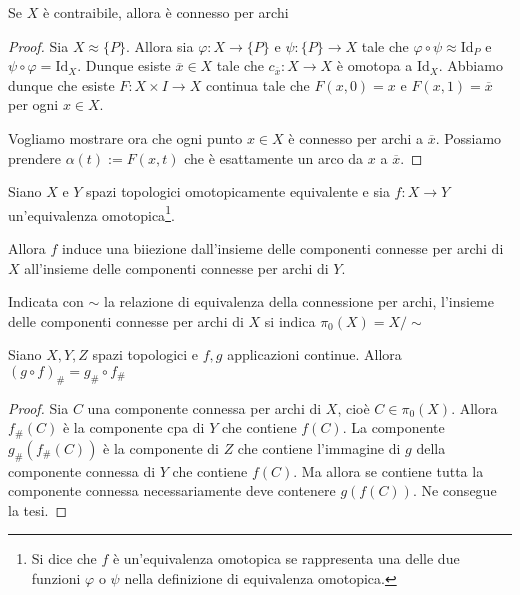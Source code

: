 \begin{proposition}\label{prop:contr_cpa}
    Se \(X\) è contraibile, allora è connesso per archi
\end{proposition}
\begin{proof}
    Sia \(X \approx \{P\} \). Allora sia \(\varphi : X \to \{P\} \) e \(\psi :
    \{P\} \to X\) tale che \(\varphi \circ \psi \approx \mathrm{Id}_P\) e \(\psi
    \circ \varphi = \mathrm{Id}_X\). Dunque esiste \(\overline{x} \in X\) tale
    che \(c_{\overline{x}} : X \to X\) è omotopa a \(\mathrm{Id}_X\). Abbiamo
    dunque che esiste \(F : X \times I \to X\) continua tale che \(F{(x, 0)} =
    x\) e \(F{(x, 1)} = \overline{x}\) per ogni \(x \in X \).

    Vogliamo mostrare ora che ogni punto \(x \in X\) è connesso per archi a
    \(\overline{x}\). Possiamo prendere \(\alpha{(t)} := F{(x, t)}\) che è
    esattamente un arco da \(x\) a \(\overline{x}\). 
\end{proof}

\begin{theorem}
    Siano \(X\) e \(Y\) spazi topologici omotopicamente equivalente e sia \(f :
    X \to Y\) un'equivalenza omotopica\footnote{Si dice che \(f\) è un'equivalenza omotopica se rappresenta una delle due
    funzioni \(\varphi \) o \(\psi\) nella definizione di equivalenza
omotopica.}.

    Allora \(f\) induce una biiezione dall'insieme delle componenti connesse per
    archi di \(X\) all'insieme delle componenti connesse per archi di \(Y\).
\end{theorem}
\begin{note}
    Indicata con \(\sim \) la relazione di equivalenza della connessione per
    archi, l'insieme delle componenti connesse per archi di \(X\) si indica
    \(\pi_0{(X)} = X / \sim \) 
\end{note}
    \begin{lemma}\label{help:omotopia_composizione}
        Siano \(X, Y, Z\) spazi topologici e \(f, g\) applicazioni continue.
        Allora \({(g \circ f)}_\# = g_\# \circ f_\#\) 
    \end{lemma}
    \begin{proof}
        Sia \(C\) una componente connessa per archi di \(X\), cioè \(C \in
        \pi_{0}{(X)}\). Allora \(f_\#{(C)}\)  è la componente cpa di \(Y\) che
        contiene \(f{(C)}\).  La componente \(g_\# {(f_\#{(C)})}\) è la
        componente di \(Z\) che contiene l'immagine di \(g\) della componente
        connessa di \(Y\) che contiene \(f{(C)}\). Ma allora se contiene tutta
        la componente connessa necessariamente deve contenere \(g{(f{(C)})}\).
        Ne consegue la tesi.
    \end{proof}
    
